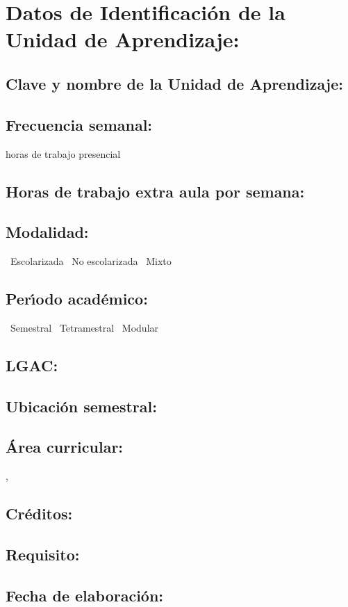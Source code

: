 \documentclass[10 pt]{article}
\begin{document}

\section{Datos de Identificaci\'{o}n de la Unidad de Aprendizaje:}
\subsection{Clave y nombre de la Unidad de Aprendizaje:} 
\subsection{Frecuencia semanal:} horas de trabajo presencial 
\subsection{Horas de trabajo extra aula por semana:} 
\subsection{Modalidad:} \yes~Escolarizada \no~No escolarizada \no~Mixto
\subsection{Per\'{\i}odo acad\'{e}mico:} \yes~Semestral
\no~Tetramestral \no~Modular
\subsection{LGAC:} \underline{\seys}
\subsection{Ubicaci\'{o}n semestral:} 
\subsection{\'{A}rea curricular:} \underline{\fr, \le}
\subsection{Cr\'{e}ditos:} 
\subsection{Requisito:} 
\subsection{Fecha de elaboraci\'{o}n:} 
\end{document}
